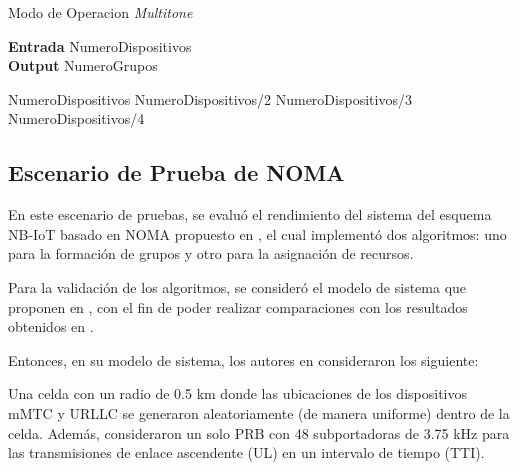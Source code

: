 \begin{algorithm}
    \caption{Modo de Operacion \textit{Multitone}}\label{A3}
    \hspace*{\algorithmicindent} \textbf{Entrada} NumeroDispositivos\\
    \hspace*{\algorithmicindent} \textbf{Output} NumeroGrupos
    \begin{algorithmic}[1]
        \Return NumeroDispositivos
        \EndIf
        \Return NumeroDispositivos/2
        \EndIf
        \Return NumeroDispositivos/3
        \EndIf
        \Return NumeroDispositivos/4
        \EndIf
        \EndIf
    \EndIf
    \EndProcedure
    \end{algorithmic}
\end{algorithm}

\break

\subsection{Escenario de Prueba de NOMA}

En este escenario de pruebas, se evaluó el rendimiento del sistema del esquema NB-IoT basado en NOMA propuesto en \parencite{Shahini2019}, el cual implementó dos algoritmos: uno para la formación de grupos y otro para la asignación de recursos. \newline

Para la validación de los algoritmos, se consideró el modelo de sistema que proponen en \parencite{Shahini2019}, con el fin de poder realizar comparaciones con los resultados obtenidos en \parencite{Shahini2019}. \newline

Entonces, en su modelo de sistema, los autores en \parencite{Shahini2019} consideraron los siguiente:\newline

Una celda con un radio de 0.5 km donde las ubicaciones de los dispositivos mMTC y URLLC se generaron aleatoriamente (de manera uniforme) dentro de la celda. Además, consideraron un solo PRB con 48 subportadoras de 3.75 kHz para las transmisiones de enlace ascendente (UL) en un intervalo de tiempo (TTI). \newline

